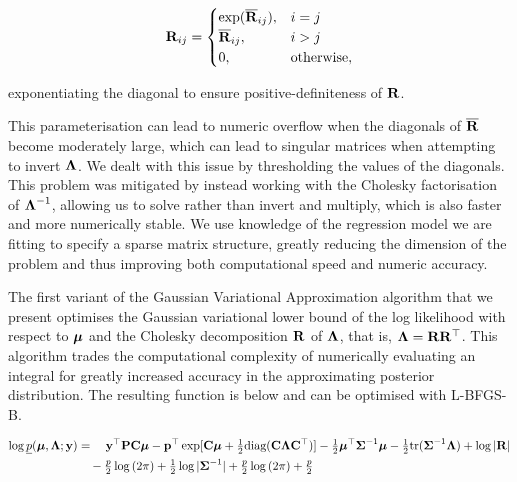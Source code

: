 \documentclass[times, doublespace]{anzsauth}
\begin{document}
	\begin{equation*}
		{\bf R}_{ij} =
		\begin{cases}
			\exp(\overline{{\bf R}}_{ij}), & i = j             \\
			\overline{{\bf R}}_{ij},       & i > j             \\
			0,                         & \text{otherwise}, 
		\end{cases}
	\end{equation*}
	
	\noindent exponentiating the diagonal to ensure positive-definiteness of ${\bf R}$.
	
  \noindent This parameterisation can lead to numeric overflow when the diagonals of $\overline{{\bf R}}$ become
	moderately large, which can lead to singular matrices when   attempting to invert ${\boldsymbol \Lambda}$. We dealt with
	this issue by thresholding the values of the diagonals.  This   problem was mitigated by  instead working with
	the Cholesky factorisation of ${\boldsymbol \Lambda}^{-1}$, allowing us to   solve rather than invert and multiply, which
	is also faster and more numerically stable. We use knowledge of   the regression model we are fitting to
	specify a sparse matrix structure, greatly reducing the dimension of   the problem and thus improving both
	computational speed and numeric accuracy.
	
	The first variant of the Gaussian Variational Approximation algorithm that we present optimises the Gaussian
	variational lower bound of the log likelihood with respect to ${\boldsymbol \mu}$ and the Cholesky decomposition ${\bf R}$ of
	${\boldsymbol \Lambda}$, that is, ${\boldsymbol \Lambda} = {\bf R} {\bf R}^\top$. This algorithm trades the computational complexity of
	numerically evaluating an integral for greatly increased accuracy in the approximating posterior
	distribution. The resulting function is below and can be optimised with L-BFGS-B.
	
	\begin{align*}
		\log \underline{p}({\boldsymbol \mu}, {\boldsymbol \Lambda}; {\bf y}) & = \quad {\bf y}^\top{\bf P} {\bf C} {\boldsymbol\mu} - {\bf p}^\top \exp[{\bf C} {\boldsymbol \mu} + \tfrac{1}{2} \text{diag}({\bf C} {\boldsymbol \Lambda} {\bf C}^\top)] - \tfrac{1}{2} {\boldsymbol \mu}^\top {\boldsymbol\Sigma}^{-1} {\boldsymbol \mu} - \tfrac{1}{2} \text{tr}{({\boldsymbol\Sigma}^{-1} {\boldsymbol\Lambda})} + \log{|{\bf R}|} \\
		                                        & \quad - \tfrac{p}{2} \log{(2 \pi)} + \tfrac{1}{2} \log{|{\boldsymbol\Sigma}^{-1}|} + \tfrac{p}{2} \log{(2 \pi)} + \tfrac{p}{2}                                                                              \\
	\end{align*}
	
\end{document}
